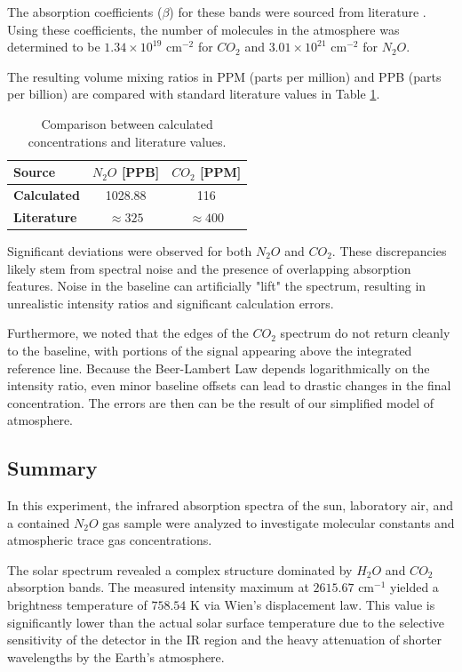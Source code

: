 The absorption coefficients ($\beta$) for these bands were sourced from literature \cite{module}. Using these coefficients, the number of molecules in the atmosphere was determined to be $1.34 \times 10^{19} \text{ cm}^{-2}$ for $CO_2$ and $3.01 \times 10^{21} \text{ cm}^{-2}$ for $N_2O$. 

The resulting volume mixing ratios in PPM (parts per million) and PPB (parts per billion) are compared with standard literature values in Table \ref{Tab: Number of particles}.

\begin{table}[H]
\centering
\begin{tabular}{l | c | c}
\textbf{Source} & \textbf{$N_2O$ [PPB]} & \textbf{$CO_2$ [PPM]} \\
\hline
\textbf{Calculated} & 1028.88 & 116 \\
\textbf{Literature} & $\approx 325$ & $\approx 400$ \\
\end{tabular}
\caption{Comparison between calculated concentrations and literature values.}
\label{Tab: Number of particles}
\end{table}

Significant deviations were observed for both $N_2O$ and $CO_2$. These discrepancies likely stem from spectral noise and the presence of overlapping absorption features. Noise in the baseline can artificially "lift" the spectrum, resulting in unrealistic intensity ratios and significant calculation errors. 

Furthermore, we noted that the edges of the $CO_2$ spectrum do not return cleanly to the baseline, with portions of the signal appearing above the integrated reference line. 
Because the Beer-Lambert Law depends logarithmically on the intensity ratio, even minor baseline offsets can lead to drastic changes in the final concentration. The errors are then
can be the result of our simplified model of atmosphere. 


\subsection{Summary} \label{Summary}

In this experiment, the infrared absorption spectra of the sun, laboratory air, and a contained $N_2O$ gas sample were analyzed to investigate molecular constants and atmospheric trace gas concentrations. 

The solar spectrum revealed a complex structure dominated by $H_2O$ and $CO_2$ absorption bands. The measured intensity maximum at $2615.67 \text{ cm}^{-1}$ yielded a brightness temperature of $758.54 \text{ K}$ via Wien's displacement law. This value is significantly lower than the actual solar surface temperature due to the selective sensitivity of the detector in the IR region and the heavy attenuation of shorter wavelengths by the Earth's atmosphere.

